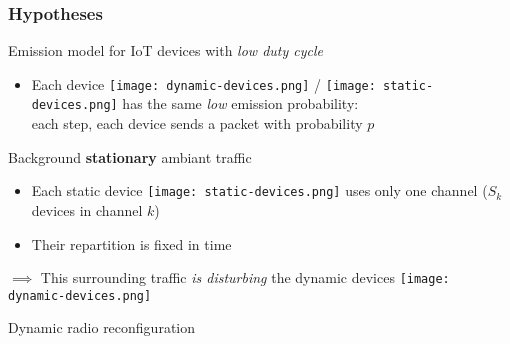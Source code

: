 \subsubsection{Hypotheses}

\begin{frameO}

    \begin{darkblock}{Emission model for IoT devices with \emph{low duty cycle}}

        \begin{itemize}
            \item
                Each device \texttt{[image: dynamic-devices.png]} / \texttt{[image: static-devices.png]}  has the same \emph{low} emission probability: \\
                each step, each device sends a packet with probability \(p\)
        \end{itemize}

    \end{darkblock}

    \vspace*{5pt}
    \pause
    \begin{colorblock}{Background \textbf{stationary} ambiant traffic}

        \begin{itemize}
            \item
                  Each static device \texttt{[image: static-devices.png]} uses only one channel
                  \hfill{} {\small ($S_k$ devices in channel $k$)}
            \item
                  Their repartition is fixed in time
        \end{itemize}

        \(\implies\) This surrounding traffic \emph{is disturbing} the dynamic devices \texttt{[image: dynamic-devices.png]}
    \end{colorblock}

    \vspace*{5pt}
    \pause
    \begin{lightblock}{Dynamic radio reconfiguration}


\end{lightblock}
\end{frameO}
